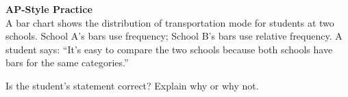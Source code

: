 \documentclass[10pt]{article}
\begin{document}
\begin{tcolorbox}[colback=redbg, colframe=redacc, boxrule=0.8pt, arc=2mm,
    left=4mm, right=4mm, top=3mm, bottom=3mm]
\small\textbf{AP-Style Practice}\\[6pt]
A bar chart shows the distribution of transportation mode for students at two
schools. School A's bars use frequency; School B's bars use relative frequency.
A student says: ``It's easy to compare the two schools because both schools
have bars for the same categories.''

\vspace{8pt}
Is the student's statement correct? Explain why or why not.\\[8pt]
\writeline\\[1pt]\writeline\\[1pt]\writeline
\end{tcolorbox}
\end{document}
